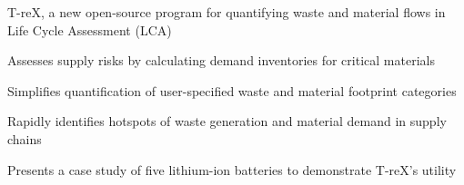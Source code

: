 \documentclass[review,3p,authoryear]{elsarticle}
\begin{document}

\vspace{4em}

\begin{highlights}
    \item T-reX, a new open-source program for quantifying waste and material flows in Life Cycle Assessment (LCA)
    \item Assesses supply risks by calculating demand inventories for critical materials
    \item Simplifies quantification of user-specified waste and material footprint categories
    \item Rapidly identifies hotspots of waste generation and material demand in supply chains
    \item Presents a case study of five lithium-ion batteries to demonstrate T-reX's utility
\end{highlights}
\end{document}

